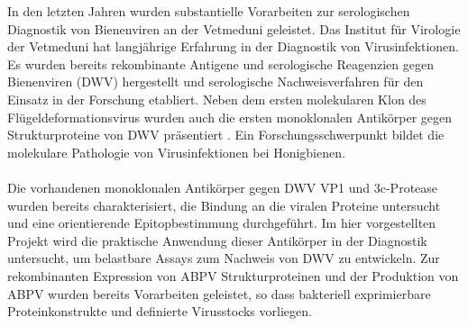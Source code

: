 In den letzten Jahren wurden substantielle Vorarbeiten zur serologischen Diagnostik von Bienenviren an der Vetmeduni geleistet. Das Institut für Virologie der Vetmeduni hat langjährige Erfahrung in der Diagnostik von Virusinfektionen. Es wurden bereits rekombinante Antigene und serologische Reagenzien gegen Bienenviren (DWV) hergestellt und serologische Nachweisverfahren für den Einsatz in der Forschung etabliert. Neben dem ersten molekularen Klon des Flügeldeformationsvirus wurden auch die ersten monoklonalen Antikörper gegen Strukturproteine von DWV präsentiert \citep{Lamp2016}. Ein Forschungsschwerpunkt bildet die molekulare Pathologie von Virusinfektionen bei Honigbienen. 
\\
\\
Die vorhandenen monoklonalen Antikörper gegen DWV VP1 und 3c-Protease wurden bereits charakterisiert, die Bindung an die viralen Proteine untersucht und eine orientierende Epitopbestimmung durchgeführt. Im hier vorgestellten Projekt wird die praktische Anwendung dieser Antikörper in der Diagnostik untersucht, um belastbare Assays zum Nachweis von DWV zu entwickeln. Zur rekombinanten Expression von ABPV Strukturproteinen und der Produktion von ABPV wurden bereits Vorarbeiten geleistet, so dass bakteriell exprimierbare Proteinkonstrukte und definierte Virusstocks vorliegen.

